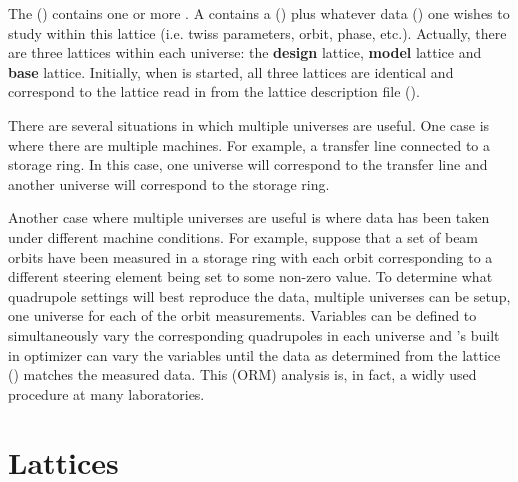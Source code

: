 The \tao {} () contains one or
more .  A  contains a 
() plus whatever data () one wishes to
study within this lattice (i.e. twiss parameters, orbit, phase,
etc.). Actually, there are three lattices within each universe: the
\textbf{design} lattice, \textbf{model} lattice and \textbf{base}
lattice. Initially, when \tao is started, all three lattices are
identical and correspond to the lattice read in from the lattice
description file ().

There are several situations in which multiple universes are
useful. One case is where there are multiple machines. For example, a
transfer line connected to a storage ring. In this case, one universe
will correspond to the transfer line and another universe will
correspond to the storage ring. 

Another case where multiple universes are useful is where data has
been taken under different machine conditions. For example, suppose
that a set of beam orbits have been measured in a storage ring with
each orbit corresponding to a different steering element being set to some
non-zero value. To determine what
quadrupole settings will best reproduce the data, multiple universes can be
setup, one universe for each of the orbit measurements. Variables can be
defined to simultaneously vary the corresponding quadrupoles in each
universe and \tao's built in optimizer can vary the variables until
the data as determined from the  lattice ()
matches the measured data. This  (ORM) analysis
is, in fact, a widly used procedure at many laboratories.

\section{Lattices}
\label{s:lattice}

